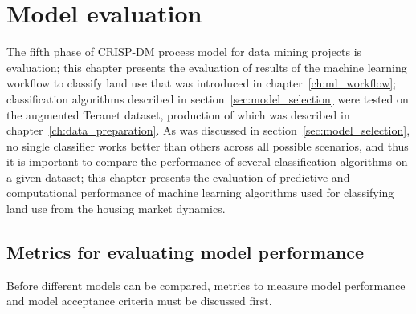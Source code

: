 \chapter{Model evaluation} \label{ch:model_evaluation}

The fifth phase of CRISP-DM process model for data mining projects is evaluation;
this chapter presents the evaluation of results of the machine learning workflow to classify land use that was introduced in chapter~\ref{ch:ml_workflow};
classification algorithms described in section~\ref{sec:model_selection} were tested on the augmented Teranet dataset, production of which was described in chapter~\ref{ch:data_preparation}.
As was discussed in section~\ref{sec:model_selection}, no single classifier works better than others across all possible scenarios, and thus it is important to compare the performance of several classification algorithms on a given dataset;
this chapter presents the evaluation of predictive and computational performance of machine learning algorithms used for classifying land use from the housing market dynamics.

\section{Metrics for evaluating model performance} \label{sec:model_metrics}

Before different models can be compared, metrics to measure model performance and model acceptance criteria must be discussed first.

